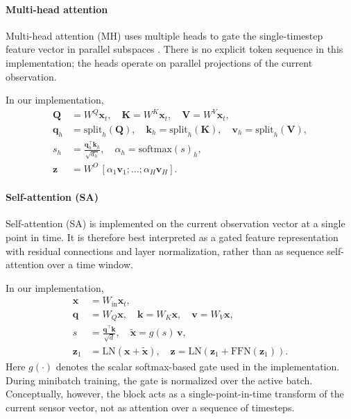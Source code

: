 \documentclass[sn-basic]{sn-jnl} %
\begin{document}
\paragraph{Multi-head attention}
Multi-head attention (MH) uses multiple heads to gate the single-timestep feature vector in parallel subspaces \cite{Vaswani2017}. There is no explicit token sequence in this implementation; the heads operate on parallel projections of the current observation.

In our implementation,
\begin{align}
        \mathbf{Q}&=W^Q\mathbf{x}_t,\quad \mathbf{K}=W^K\mathbf{x}_t,\quad \mathbf{V}=W^V\mathbf{x}_t,\\
        \mathbf{q}_h&=\mathrm{split}_h(\mathbf{Q}),\quad \mathbf{k}_h=\mathrm{split}_h(\mathbf{K}),\quad \mathbf{v}_h=\mathrm{split}_h(\mathbf{V}),\\
        s_h&=\frac{\mathbf{q}_h^\top\mathbf{k}_h}{\sqrt{d_h}},\quad \alpha_h=\mathrm{softmax}(s)_h,\\
        \mathbf{z}&=W^O\,[\alpha_1\mathbf{v}_1;\ldots;\alpha_H\mathbf{v}_H].
\end{align}

\paragraph{Self-attention (SA)}
Self-attention (SA) is implemented on the current observation vector at a single point in time. It is therefore best interpreted as a gated feature representation with residual connections and layer normalization, rather than as sequence self-attention over a time window.

In our implementation,
\begin{align}
        \mathbf{x} &= W_{\mathrm{in}}\mathbf{x}_t,\\
        \mathbf{q} &= W_Q\mathbf{x},\quad \mathbf{k}=W_K\mathbf{x},\quad \mathbf{v}=W_V\mathbf{x},\\
        s &= \frac{\mathbf{q}^\top\mathbf{k}}{\sqrt{d}},\quad \tilde{\mathbf{x}} = g(s)\,\mathbf{v},\\
        \mathbf{z}_1 &= \mathrm{LN}\!\left(\mathbf{x}+\tilde{\mathbf{x}}\right),\quad
        \mathbf{z}=\mathrm{LN}\!\left(\mathbf{z}_1+\mathrm{FFN}(\mathbf{z}_1)\right).
\end{align}
Here $g(\cdot)$ denotes the scalar softmax-based gate used in the implementation. During minibatch training, the gate is normalized over the active batch. Conceptually, however, the block acts as a single-point-in-time transform of the current sensor vector, not as attention over a sequence of timesteps.
\end{document}
